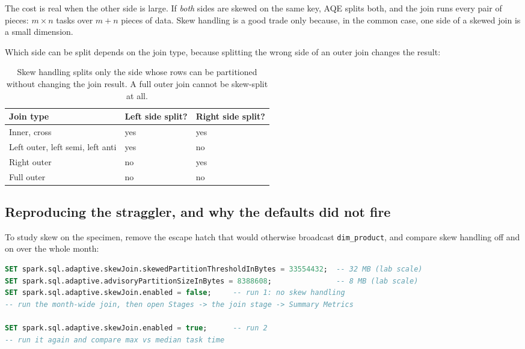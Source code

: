 The cost is real when the other side is large. If \emph{both} sides are skewed on
the same key, AQE splits both, and the join runs every pair of pieces: $m \times
n$ tasks over $m + n$ pieces of data. Skew handling is a good trade only because,
in the common case, one side of a skewed join is a small dimension.

Which side can be split depends on the join type, because splitting the wrong
side of an outer join changes the result:

\begin{table}[htbp]
\centering\footnotesize
\renewcommand{\arraystretch}{1.25}
\begin{tabular}{@{}P{4.5cm}P{4.2cm}P{5.0cm}@{}}
\toprule
\textbf{Join type} & \textbf{Left side split?} & \textbf{Right side split?} \\
\midrule
Inner, cross & yes & yes \\
Left outer, left semi, left anti & yes & no \\
Right outer & no & yes \\
Full outer & no & no \\
\bottomrule
\end{tabular}
\caption{Skew handling splits only the side whose rows can be partitioned
without changing the join result. A full outer join cannot be skew-split at all.}
\label{tab:aqe-skew-jointype}
\end{table}

\subsection{Reproducing the straggler, and why the defaults did not fire}

To study skew on the specimen, remove the escape hatch that would otherwise
broadcast \texttt{dim\_product}, and compare skew handling off and on over the
whole month:

\begin{lstlisting}[language=SQL,style=plan,caption={Isolating skew handling on the specimen's join},captionpos=b,label=lst:aqe-skew-experiment]
SET spark.sql.adaptive.skewJoin.skewedPartitionThresholdInBytes = 33554432;  -- 32 MB (lab scale)
SET spark.sql.adaptive.advisoryPartitionSizeInBytes = 8388608;               -- 8 MB (lab scale)
SET spark.sql.adaptive.skewJoin.enabled = false;     -- run 1: no skew handling
-- run the month-wide join, then open Stages -> the join stage -> Summary Metrics

SET spark.sql.adaptive.skewJoin.enabled = true;      -- run 2
-- run it again and compare max vs median task time
\end{lstlisting}

